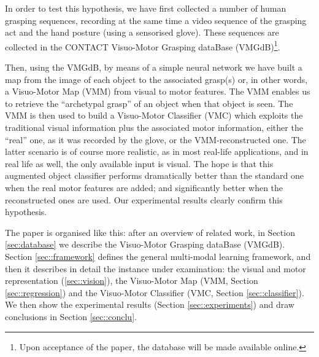 In order to test this hypothesis, we have first collected a number of
human grasping sequences, recording at the same time a video sequence of the grasping act
and the hand posture (using a sensorised glove). These sequences are collected in
the CONTACT Visuo-Motor Grasping dataBase (VMGdB)\footnote{Upon acceptance
of the paper, the database will be made available online.}. 

Then, using the VMGdB, by means of a simple
neural network we have built a map from the image of each object to the associated
grasp(s) or, in other words, a Visuo-Motor Map (VMM) from visual to motor features.
The VMM enables us to retrieve the ``archetypal grasp'' of an object when that
object is seen.
The VMM is then used to build a Visuo-Motor Classifier (VMC)
which exploits the traditional visual information plus the associated motor information,
either the ``real'' one, as it was recorded by the glove, or the VMM-reconstructed
one. The latter scenario is of course more realistic, as in most real-life applications,
and in real life as well, the only available input is visual.
The hope is that this augmented object classifier performs dramatically better
than the standard one when the real motor features are added; and significantly
better when the reconstructed ones are used. Our experimental results clearly
confirm this hypothesis.

The paper is organised like this: after an overview of related work, in Section
\ref{sec:database} we describe the Visuo-Motor Grasping dataBase (VMGdB).
Section \ref{sec::framework}  defines the general multi-modal learning framework, and
then it describes in detail the instance under examination:
the visual and motor representation (\ref{sec::vision}),
the Visuo-Motor Map (VMM, Section \ref{sec::regression}) and 
the Visuo-Motor Classifier  (VMC, Section \ref{sec::classifier}). 
We then show the
experimental results (Section \ref{sec::experiments}) and draw  conclusions
in Section \ref{sec::conclu}.

